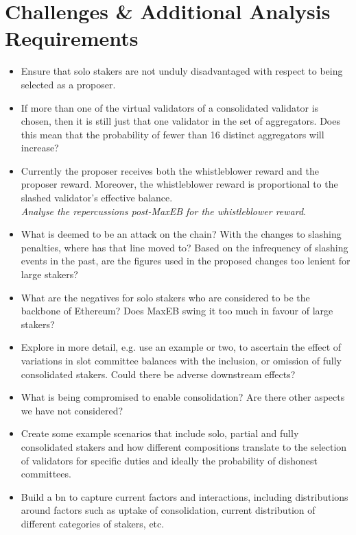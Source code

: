\documentclass[UTF8]{article}
\begin{document}
\section{Challenges \& Additional Analysis Requirements}
\begin{itemize}
\item Ensure that solo stakers are not unduly disadvantaged with respect to being selected as a proposer.
\item If more than one of the virtual validators of a consolidated validator is chosen, then it is still just that one validator in the set of aggregators. Does this mean that  the probability of fewer than 16 distinct aggregators will increase?
\item Currently the proposer receives both the whistleblower reward and the proposer reward. Moreover, the whistleblower reward is proportional to the slashed validator's effective balance. \\
\textit{Analyse the repercussions post-MaxEB for the whistleblower reward}.
\item What is deemed to be an attack on the chain? With the changes to slashing penalties, where has that line moved to? Based on the infrequency of slashing events in the past, are the figures used in the proposed changes too lenient for large stakers?
\item What are the negatives for solo stakers who are considered to be the backbone of Ethereum? Does MaxEB swing it too much in favour of large stakers?
\item Explore in more detail, e.g. use an example or two, to ascertain the effect of variations in slot committee balances with the inclusion, or omission of fully consolidated stakers. Could there be adverse downstream effects?
\item What is being compromised to enable consolidation? Are there other aspects we have not considered?
\item Create some example scenarios that include solo, partial and fully consolidated stakers and how different compositions translate to the selection of validators for specific duties and ideally the probability of dishonest committees.
\item Build a \gls{bn} to capture current factors and interactions, including distributions around factors such as uptake of consolidation, current distribution of different categories of stakers, etc.
\end{itemize}
\end{document}
